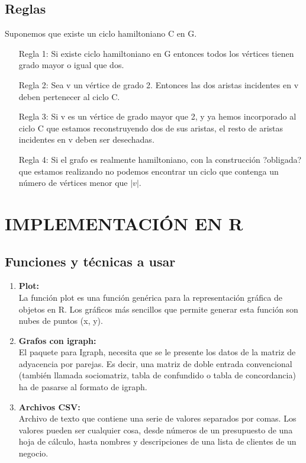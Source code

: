 \documentclass[journal]{IEEEtran}
\begin{document}
\subsection{Reglas}
	Suponemos que existe un ciclo hamiltoniano C en G.
\begin{enumerate}
	\item[Regla 1:]  Si existe ciclo hamiltoniano en G entonces todos los v{\'e}rtices tienen grado mayor o igual que dos.
	\item[Regla 2:] Sea v un v{\'e}rtice de grado 2. Entonces las dos aristas incidentes en v deben pertenecer al ciclo C.
	\item[Regla 3:] Si v es un vértice de grado mayor que 2, y ya hemos incorporado al ciclo C que estamos reconstruyendo dos de sus aristas, el resto de aristas incidentes en v deben ser desechadas.
	\item[Regla 4:] Si el grafo es realmente hamiltoniano, con la construcci{\'o}n ?obligada? que estamos realizando no podemos encontrar un ciclo que contenga un número de vértices menor que $|v|$.
\end{enumerate}

\section{\large\bf IMPLEMENTACI{\'O}N EN R}

\subsection{Funciones y t{\'e}cnicas a usar}

\begin{enumerate}
	\item{\bf Plot:}\\ La funci{\'o}n plot es una función gen{\'e}rica para la representaci{\'o}n gr{\'a}fica de objetos en R. Los gr{\'a}ficos m{\'a}s sencillos que permite generar esta funci{\'o}n son nubes de puntos (x, y).
	
	\item{\bf Grafos con igraph:}\\ El paquete para Igraph, necesita que se le presente los datos de la matriz de adyacencia por parejas. Es decir, una matriz de doble entrada convencional (tambi{\'e}n llamada sociomatriz, tabla de confundido o tabla de concordancia) ha de pasarse al formato de igraph.
	
	\item{\bf Archivos CSV:}\\ Archivo de texto que contiene una serie de valores separados por comas. Los valores pueden ser cualquier cosa, desde n{\'u}meros de un presupuesto de una hoja de c{\'a}lculo, hasta nombres y descripciones de una lista de clientes de un negocio.
	
\end{enumerate}
\end{document}
